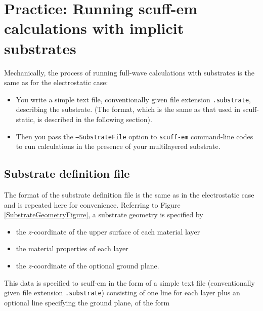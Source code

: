\documentclass[letterpaper]{article}
\begin{document}
\newpage  
\section{Practice: Running {\sc scuff-em} calculations
         with implicit substrates}
\label{MechanicsSection}
 
Mechanically, the process of running full-wave calculations
with substrates is the same as for the electrostatic case:

\begin{itemize}
  \item You write a simple text file, conventionally given
        file extension \texttt{.substrate}, describing the
        substrate. (The format, which is the same as that
        used in {\sc scuff-static}, is described in the 
        following section).
  \item Then you pass the \texttt{--SubstrateFile} option to
        \texttt{scuff-em} command-line codes to run calculations
        in the presence of your multilayered substrate.
\end{itemize}

\subsection{Substrate definition file}

The format of the substrate definition file
is the same as in the electrostatic case
and is repeated here for convenience.
Referring to Figure \ref{SubstrateGeometryFigure},
a substrate geometry is specified by
\begin{itemize}
 \item the $z$-coordinate of the upper surface of each material layer
 \item the material properties of each layer
 \item the $z$-coordinate of the optional ground plane.
\end{itemize}

This data is specified to {\sc scuff-em} in the
form of a simple text file (conventionally given file
extension \texttt{.substrate}) consisting of one line for each
layer plus an optional line specifying the ground
plane, of the form
\end{document}
